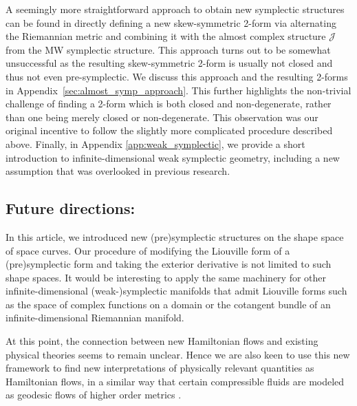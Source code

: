 \documentclass[12pt]{amsart}
\newcommand{\rev}[1]{#1}
\theoremstyle{definition}
\def\J{\mathcal{J}}
\begin{document}

\rev{A seemingly more straightforward approach to obtain new symplectic structures  can be found in directly defining a new skew-symmetric 2-form via alternating the Riemannian metric and combining it with the almost complex structure $\J$ from the MW symplectic structure. This approach turns out to be somewhat unsuccessful as the resulting skew-symmetric 2-form is usually not closed and thus not even pre-symplectic. We discuss this approach and the resulting 2-forms in Appendix~\ref{sec:almost_symp_approach}. This further highlights the non-trivial challenge of finding a 2-form which is both closed and non-degenerate, rather than one being merely closed or non-degenerate. This observation was our original incentive to follow the slightly more complicated procedure described above. Finally, in} Appendix \ref{app:weak_symplectic}, we provide a short introduction to infinite-dimensional weak symplectic geometry, including a new assumption that was overlooked in previous research.





\subsection*{Future directions:}
In this article, we introduced new (pre)symplectic structures on the shape space of space curves. Our procedure of modifying the Liouville form of a (pre)symplectic form and taking the exterior derivative is not limited to such shape spaces. It would be interesting to apply the same machinery for other infinite-dimensional (weak-)symplectic manifolds that admit Liouville forms such as the space of complex functions on a domain or the cotangent bundle of an infinite-dimensional Riemannian manifold. 

At this point, the connection between new Hamiltonian flows and existing physical theories seems to remain unclear. Hence we are also keen to use this new framework to find new interpretations of physically relevant quantities as Hamiltonian flows, in a similar way that certain compressible fluids are modeled as geodesic flows of higher order metrics \cite{MichorMumford2013EPDiff}. 
\end{document}
